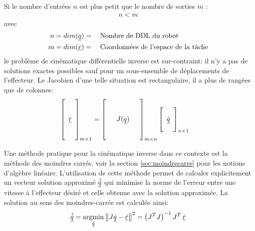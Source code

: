 Si le nombre d'entrées $n$ est plus petit que le nombre de sorties $m$ :
\begin{align}
	n < m
\end{align}
avec
\begin{align}
	n &= dim(\underline{q}) = \quad\text{Nombre de DDL du robot} \\
	m &= dim(\underline{r}) = \quad\text{Coordonnées de l'espace de la tâche}
\end{align}
le problème de cinématique différentielle inverse est sur-contraint: il n'y a pas de solutions exactes possibles sauf pour un sous-ensemble de déplacements de l'effecteur. Le Jacobien d'une telle situation est rectangulaire, il a plus de rangées que de colonnes:
\begin{align}
	\left[ \begin{array}{c}  \\ \\ \dot{\underline{r}} \\ \\ \\
	\end{array} \right]_{m \times 1}
	&=
	\left[ \begin{array}{c c c}
			   &&\\
			   &&\\
			   & J(\underline{q}) &\\
			   &&\\
			   &&
	\end{array} \right]_{m \times n}
	\left[ \begin{array}{c}
			   \\ \dot{\underline{q}} \\ \\
	\end{array} \right]_{n \times 1}
	\label{eq:uoverconstraintdiffkin}
\end{align}

Une méthode pratique pour la cinématique inverse dans ce contexte est la méthode des moindres carrés, voir la section \ref{sec:moindrecarre} pour les notions d'algèbre linéaire. L'utilisation de cette méthode permet de calculer explicitement un vecteur solution approximé $\underline{\hat{\dot{q}}}$ qui minimise la norme de l'erreur entre une vitesse à l'effecteur désiré et celle obtenue avec la solution approximée. La solution au sens des moindres-carrée est calculée ainsi:
\begin{align}
	\col{\hat{\dot{q}}} = \operatornamewithlimits{argmin}\limits_{\col{\dot{q}}} \left\| J \col{\dot{q}} - \col{\dot{r}} \right\|^2 = \left( J^T J\right)^{-1} J^T \, \dot{\col{r}}
	\label{eq:overconstraintdiffkinleastsquare}
\end{align}



